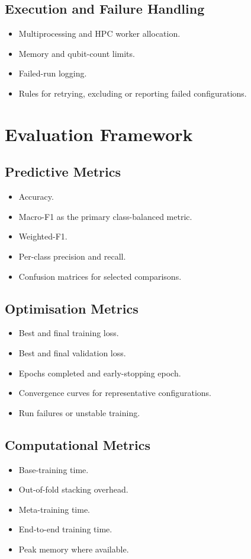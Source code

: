 \documentclass[]{UCD_CS_MSc_AAI_Report}
\begin{document}
\subsection{Execution and Failure Handling}
\begin{itemize}
    \item Multiprocessing and HPC worker allocation.
    \item Memory and qubit-count limits.
    \item Failed-run logging.
    \item Rules for retrying, excluding or reporting failed configurations.
\end{itemize}

\section{Evaluation Framework}
\label{sec:method-evaluation}

\subsection{Predictive Metrics}
\begin{itemize}
    \item Accuracy.
    \item Macro-F1 as the primary class-balanced metric.
    \item Weighted-F1.
    \item Per-class precision and recall.
    \item Confusion matrices for selected comparisons.
\end{itemize}

\subsection{Optimisation Metrics}
\begin{itemize}
    \item Best and final training loss.
    \item Best and final validation loss.
    \item Epochs completed and early-stopping epoch.
    \item Convergence curves for representative configurations.
    \item Run failures or unstable training.
\end{itemize}

\subsection{Computational Metrics}
\begin{itemize}
    \item Base-training time.
    \item Out-of-fold stacking overhead.
    \item Meta-training time.
    \item End-to-end training time.
    \item Peak memory where available.
\end{itemize}
\end{document}
